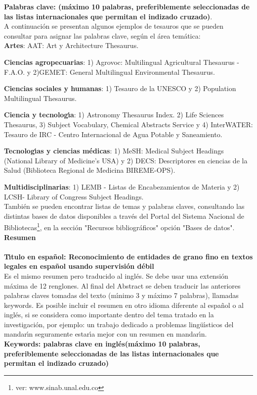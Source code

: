 \textbf{\small Palabras clave: (m\'{a}ximo 10 palabras, preferiblemente seleccionadas de las listas internacionales que permitan el indizado cruzado)}.\\

A continuaci\'{o}n se presentan algunos ejemplos de tesauros que se pueden consultar para asignar las palabras clave, seg\'{u}n el \'{a}rea tem\'{a}tica:\\

\textbf{Artes}: AAT: Art y Architecture Thesaurus.

\textbf{Ciencias agropecuarias}: 1) Agrovoc: Multilingual Agricultural Thesaurus - F.A.O. y 2)GEMET: General Multilingual Environmental Thesaurus.

\textbf{Ciencias sociales y humanas}: 1) Tesauro de la UNESCO y 2) Population Multilingual Thesaurus.

\textbf{Ciencia y tecnolog\'{\i}a}: 1) Astronomy Thesaurus Index. 2) Life Sciences Thesaurus, 3) Subject Vocabulary, Chemical Abstracts Service y 4) InterWATER: Tesauro de IRC - Centro Internacional de Agua Potable y Saneamiento.

\textbf{Tecnolog\'{\i}as y ciencias m\'{e}dicas}: 1) MeSH: Medical Subject Headings (National Library of Medicine's USA) y 2) DECS: Descriptores en ciencias de la Salud (Biblioteca Regional de Medicina BIREME-OPS).

\textbf{Multidisciplinarias}: 1) LEMB - Listas de Encabezamientos de Materia y 2) LCSH- Library of Congress Subject Headings.\\

Tambi\'{e}n se pueden encontrar listas de temas y palabras claves, consultando las distintas bases de datos disponibles a trav\'{e}s del Portal del Sistema Nacional de Bibliotecas\footnote{ver: www.sinab.unal.edu.co}, en la secci\'{o}n "Recursos bibliogr\'{a}ficos" opci\'{o}n "Bases de datos".\\

\textbf{\LARGE Resumen}\\\\
\textbf{T\'{\i}tulo en espa\~{n}ol: Reconocimiento de entidades de grano fino en textos legales en espa\~{n}ol usando supervisi\'{o}n d\'{e}bil}\\[0.5cm]
Es el mismo resumen pero traducido al ingl\'{e}s. Se debe usar una extensi\'{o}n m\'{a}xima de 12 renglones. Al final del Abstract se deben traducir las anteriores palabras claves tomadas del texto (m\'{\i}nimo 3 y m\'{a}ximo 7 palabras), llamadas keywords. Es posible incluir el resumen en otro idioma diferente al espa\~{n}ol o al ingl\'{e}s, si se considera como importante dentro del tema tratado en la investigaci\'{o}n, por ejemplo: un trabajo dedicado a problemas ling\"{u}\'{\i}sticos del mandar\'{\i}n seguramente estar\'{\i}a mejor con un resumen en mandar\'{\i}n.\\[2.0cm]
\textbf{\small Keywords: palabras clave en ingl\'{e}s(m\'{a}ximo 10 palabras, preferiblemente seleccionadas de las listas internacionales que permitan el indizado cruzado)}\\